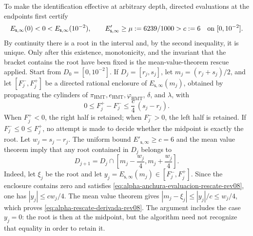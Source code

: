 To make the identification effective at arbitrary depth, directed evaluations
at the endpoints first certify
\[
 E_{\mathsf s,\infty}(0)<0<
 E_{\mathsf s,\infty}(10^{-2}),
 \qquad
 E'_{\mathsf s,\infty}\geq\mu:=6239/1000>c:=6
 \quad\hbox{on }[0,10^{-2}].
\]
By continuity there is a root in the interval and, by the second inequality,
it is unique. Only after this existence, monotonicity, and the invariant that
the bracket contains the root have been fixed is the mean-value-theorem
rescue applied. Start from \(D_0=[0,10^{-2}]\). If
\(D_j=[r_j,s_j]\), let \(m_j=(r_j+s_j)/2\), and let
\([F_j^-,F_j^+]\) be a directed rational enclosure of
\(E_{\mathsf s,\infty}(m_j)\), obtained by propagating the cylinders of
\(\pi_{\mathrm{HMT}},e_{\mathrm{HMT}},\varphi_{\mathrm{HMT}}\),
\(\delta\), and \(\lambda\), with
\begin{equation}
 0\leq F_j^+-F_j^-\leq \frac{c}{4}\,(s_j-r_j).
 \label{eq:alpha-anchura-evaluacion-rescate-rev08}
\end{equation}
When \(F_j^+<0\), the right half is retained; when \(F_j^->0\), the left
half is retained. If \(F_j^-\leq0\leq F_j^+\), no attempt is made to decide
whether the midpoint is exactly the root. Let \(w_j=s_j-r_j\). The uniform
bound \(E'_{\mathsf s,\infty}\geq c=6\) and the mean value theorem imply
that any root contained in \(D_j\) belongs to
\begin{equation}
 D_{j+1}=D_j\cap
 \left[m_j-\frac{w_j}{4},
             m_j+\frac{w_j}{4}\right].
 \label{eq:alpha-rescate-derivada-rev08}
\end{equation}
Indeed, let \(\xi_j\) be the root and let
\(y_j=E_{\mathsf s,\infty}(m_j)\in[F_j^-,F_j^+]\). Since the enclosure
contains zero and satisfies
\eqref{eq:alpha-anchura-evaluacion-rescate-rev08}, one has
\(|y_j|\leq cw_j/4\). The mean value theorem gives
\(|m_j-\xi_j|\leq |y_j|/c\leq w_j/4\), which proves
\eqref{eq:alpha-rescate-derivada-rev08}. The argument includes the case
\(y_j=0\): the root is then at the midpoint, but the algorithm need not
recognize that equality in order to retain it.

